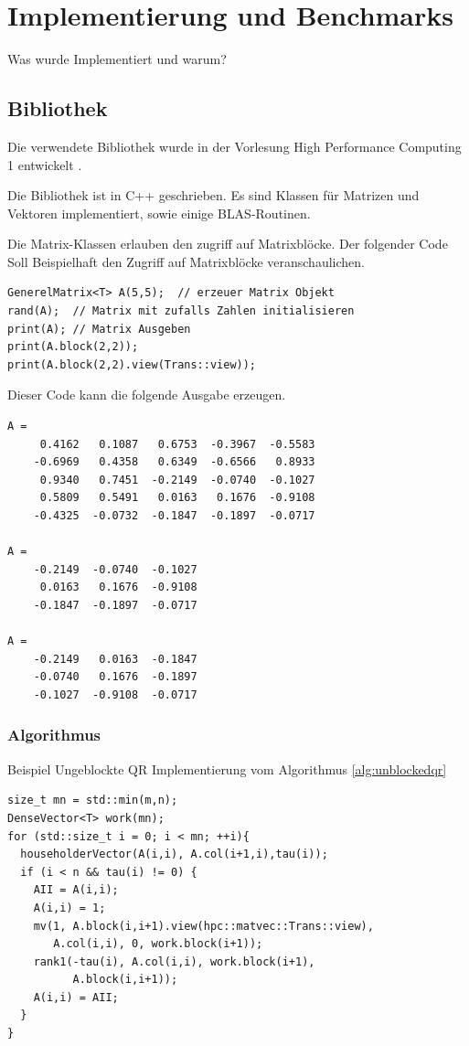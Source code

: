 \chapter{Implementierung und Benchmarks}
Was wurde Implementiert und warum?

\section{Bibliothek}
Die verwendete Bibliothek wurde in der Vorlesung High Performance Computing 1 entwickelt \cite{HPC1}.

Die Bibliothek ist in C++ geschrieben. Es sind Klassen für Matrizen und Vektoren implementiert, sowie einige BLAS-Routinen.

Die Matrix-Klassen erlauben den zugriff auf Matrixblöcke. 
Der folgender Code Soll Beispielhaft den Zugriff auf Matrixblöcke veranschaulichen.
\begin{lstlisting}
GenerelMatrix<T> A(5,5);  // erzeuer Matrix Objekt
rand(A);  // Matrix mit zufalls Zahlen initialisieren
print(A); // Matrix Ausgeben
print(A.block(2,2));
print(A.block(2,2).view(Trans::view));
\end{lstlisting}
Dieser Code kann die folgende Ausgabe erzeugen.
\lstset{numbers=none}
\begin{lstlisting} 
A = 
     0.4162   0.1087   0.6753  -0.3967  -0.5583
    -0.6969   0.4358   0.6349  -0.6566   0.8933
     0.9340   0.7451  -0.2149  -0.0740  -0.1027
     0.5809   0.5491   0.0163   0.1676  -0.9108
    -0.4325  -0.0732  -0.1847  -0.1897  -0.0717

A = 
    -0.2149  -0.0740  -0.1027
     0.0163   0.1676  -0.9108
    -0.1847  -0.1897  -0.0717

A = 
    -0.2149   0.0163  -0.1847
    -0.0740   0.1676  -0.1897
    -0.1027  -0.9108  -0.0717
\end{lstlisting}

\subsection{Algorithmus}

Beispiel Ungeblockte QR Implementierung vom Algorithmus \ref{alg:unblockedqr}
\lstset{numbers=left}
\begin{lstlisting}
size_t mn = std::min(m,n);
DenseVector<T> work(mn);
for (std::size_t i = 0; i < mn; ++i){
  householderVector(A(i,i), A.col(i+1,i),tau(i));
  if (i < n && tau(i) != 0) {
    AII = A(i,i);
    A(i,i) = 1;
    mv(1, A.block(i,i+1).view(hpc::matvec::Trans::view),
       A.col(i,i), 0, work.block(i+1));
    rank1(-tau(i), A.col(i,i), work.block(i+1), 
          A.block(i,i+1));
    A(i,i) = AII;
  }
}
\end{lstlisting}

